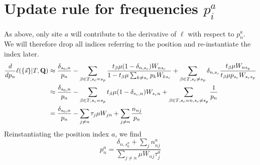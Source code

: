 \documentclass[aps,rmp,onecolumn]{revtex4}
\newcommand{\mat}[1]{{\bf #1}}
\newcommand{\eqp}{p}
\newcommand{\lh}{\ell}
\begin{document}
\section*{Update rule for frequencies $\eqp_i^a$}
As above, only site $a$ will contribute to the derivative of $\lh$ with respect to $\eqp^a_n$.
We will therefore drop all indices referring to the position and re-instantiate the index later.
\begin{equation}
\begin{split}
	\frac{d}{d \eqp_n} \lh (\{\vec{s}\} |T, \mat{Q}) & \approx \frac{\delta_{s_0,n}}{\eqp_n}
	-\sum_{\beta\in T,s_c=s_p} \frac{t_\beta\mu (1-\delta_{n,s_c})W_{n s_c}}{1 - t_\beta\mu \sum_{k\neq s_c} \eqp_k W_{ks_c}}
	 + \sum_{\beta\in T,s_c\neq s_p} \delta_{n,s_c}\frac{t_\beta\mu W_{ns_p}}{t_\beta \mu \eqp_{s_c} W_{s_c s_p}}\\
	 & \approx 	\frac{\delta_{s_0,n}}{\eqp_n}-\sum_{\beta\in T,s_c=s_p} t_\beta\mu (1-\delta_{s_c, n})W_{s_c n}
	 + \sum_{\beta\in T,s_c=n, s_c\neq s_p} \frac{1}{\eqp_{n}}\\
	 & = 	\frac{\delta_{s_0,n}}{\eqp_n}-\sum_{j\neq n} \tau_j \mu W_{j n}
	 + \sum_{j\neq n}\frac{n_{nj}}{\eqp_{n}}
\end{split}
\end{equation}
Reinstantiating the position index $a$, we find
\begin{equation}
	\eqp^a_n = \frac{\delta_{n,s^a_0}+\sum_j n^a_{nj}}{\sum_{j\neq n} \mu W_{nj}\tau^a_j}
\end{equation}
\end{document}

